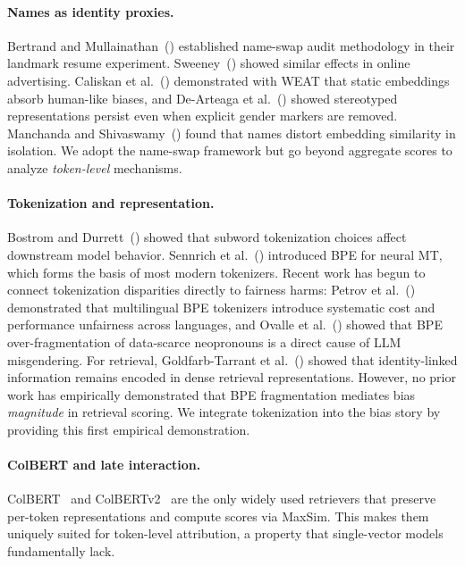 \documentclass[sigconf,review,anonymous]{acmart}
\begin{document}
\paragraph{Names as identity proxies.}
Bertrand and Mullainathan~(\citeyear{bertrand2004}) established name-swap audit methodology in their landmark resume experiment. Sweeney~(\citeyear{sweeney2013}) showed similar effects in online advertising. Caliskan et al.~(\citeyear{caliskan2017}) demonstrated with WEAT that static embeddings absorb human-like biases, and De-Arteaga et al.~(\citeyear{dearteaga2019}) showed stereotyped representations persist even when explicit gender markers are removed. Manchanda and Shivaswamy~(\citeyear{manchanda2025}) found that names distort embedding similarity in isolation. We adopt the name-swap framework but go beyond aggregate scores to analyze \emph{token-level} mechanisms.

\paragraph{Tokenization and representation.}
Bostrom and Durrett~(\citeyear{bostrom2020}) showed that subword tokenization choices affect downstream model behavior. Sennrich et al.~(\citeyear{sennrich2016}) introduced BPE for neural MT, which forms the basis of most modern tokenizers. Recent work has begun to connect tokenization disparities directly to fairness harms: Petrov et al.~(\citeyear{petrov2023}) demonstrated that multilingual BPE tokenizers introduce systematic cost and performance unfairness across languages, and Ovalle et al.~(\citeyear{ovalle2024}) showed that BPE over-fragmentation of data-scarce neopronouns is a direct cause of LLM misgendering. For retrieval, Goldfarb-Tarrant et al.~(\citeyear{goldfarb2024}) showed that identity-linked information remains encoded in dense retrieval representations. However, no prior work has empirically demonstrated that BPE fragmentation mediates bias \emph{magnitude} in retrieval scoring. We integrate tokenization into the bias story by providing this first empirical demonstration.

\paragraph{ColBERT and late interaction.}
ColBERT~\cite{khattab2020} and ColBERTv2~\cite{santhanam2022} are the only widely used retrievers that preserve per-token representations and compute scores via MaxSim. This makes them uniquely suited for token-level attribution, a property that single-vector models~\cite{karpukhin2020} fundamentally lack.
\end{document}
